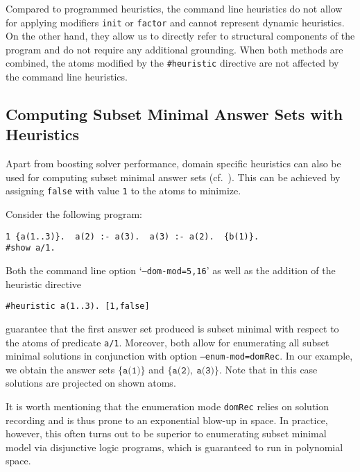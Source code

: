 Compared to programmed heuristics,
the command line heuristics do not allow for applying modifiers \texttt{init} or \texttt{factor}
and cannot represent dynamic heuristics.
On the other hand, they allow us to directly refer to structural components of the program
and do not require any additional grounding.
%
When both methods are combined,
the atoms modified by the \texttt{\#heuristic} directive are not affected by the command line heuristics.

\subsection{Computing Subset Minimal Answer Sets with Heuristics}

Apart from boosting solver performance,
domain specific heuristics can also be used for computing subset minimal answer sets
(cf.\ \cite{cacacale96a,rogima10a}).
This can be achieved by assigning \texttt{false} with value \texttt{1} to the atoms to minimize. %
\begin{example}
Consider the following program:
\begin{lstlisting}[numbers=none]
1 {a(1..3)}.  a(2) :- a(3).  a(3) :- a(2).  {b(1)}.  
#show a/1.
\end{lstlisting}
Both the command line option `\texttt{--dom-mod=5,16}' as well as the addition of the heuristic directive
\begin{lstlisting}[numbers=none]
#heuristic a(1..3). [1,false]
\end{lstlisting}
guarantee that the first answer set produced is subset minimal with respect to the atoms of predicate \texttt{a/1}.
Moreover, both allow for enumerating all subset minimal solutions in conjunction with option \texttt{--enum-mod=domRec}.
In our example, we obtain the answer sets
\(
\{\texttt{a(1)}\}
\)
and
\(
\{\texttt{a(2)},\ \texttt{a(3)}\}
\).
Note that in this case solutions are projected on shown atoms.
\end{example}
It is worth mentioning that the enumeration mode \texttt{domRec} relies on solution recording and is thus prone to an exponential blow-up in space.
In practice, however, this often turns out to be superior to enumerating subset minimal model via disjunctive logic programs,
which is guaranteed to run in polynomial space.

